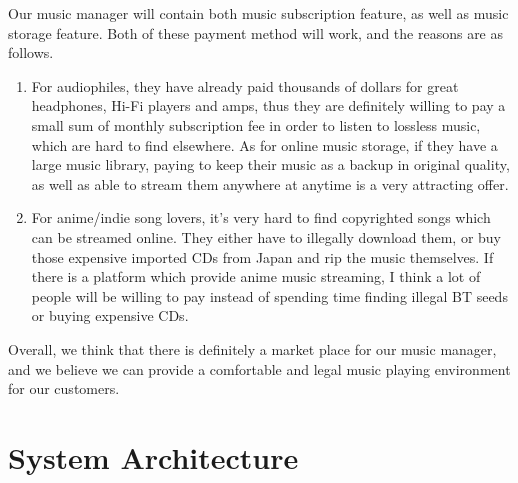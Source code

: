 \documentclass[12pt, a4paper, oneside]{article}
\newcommand{\env}[2]{\begin{#1}#2\end{#1}}
\begin{document}
Our music manager will contain both music subscription feature, as well as music storage feature.
Both of these payment method will work, and the reasons are as follows. 

\env{enumerate} {
\item For audiophiles, they have already paid thousands of dollars for great headphones,
    Hi-Fi players and amps, thus they are definitely willing to pay a small sum of monthly
    subscription fee in order to listen to lossless music, which are hard to find elsewhere.
    As for online music storage, if they have a large music library, paying to keep their music
    as a backup in original quality, as well as able to stream them anywhere at anytime is a
    very attracting offer.
\item For anime/indie song lovers, it’s very hard to find copyrighted songs which can be
    streamed online. They either have to illegally download them, or buy those expensive
    imported CDs from Japan and rip the music themselves. If there is a platform which provide
    anime music streaming, I think a lot of people will be willing to pay instead of spending
    time finding illegal BT seeds or buying expensive CDs. 
}

Overall, we think that there is definitely a market place for our music manager, and we believe
we can provide a comfortable and legal music playing environment for our customers.

\newpage
\section{System Architecture}
\end{document}
